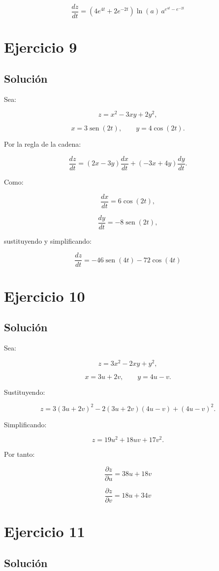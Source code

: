 \documentclass[11pt,a4paper]{article}
\newcommand{\sen}{\operatorname{sen}}
\begin{document}
\[
\boxed{
\frac{dz}{dt}
=
\left(
4e^{4t}
+
2e^{-2t}
\right)
\ln(a)\,
a^{e^{4t}-e^{-2t}}
}
\]

\section{Ejercicio 9}
\subsection{Solución}

Sea:

\[
z=x^2-3xy+2y^2,
\]

\[
x=3\sen(2t),
\qquad
y=4\cos(2t).
\]

Por la regla de la cadena:

\[
\frac{dz}{dt}
=
(2x-3y)\frac{dx}{dt}
+
(-3x+4y)\frac{dy}{dt}.
\]

Como:

\[
\frac{dx}{dt}=6\cos(2t),
\]

\[
\frac{dy}{dt}=-8\sen(2t),
\]

sustituyendo y simplificando:

\[
\boxed{
\frac{dz}{dt}
=
-46\sen(4t)-72\cos(4t)
}
\]

\section{Ejercicio 10}
\subsection{Solución}

Sea:

\[
z=3x^2-2xy+y^2,
\]

\[
x=3u+2v,
\qquad
y=4u-v.
\]

Sustituyendo:

\[
z
=
3(3u+2v)^2
-
2(3u+2v)(4u-v)
+
(4u-v)^2.
\]

Simplificando:

\[
z
=
19u^2+18uv+17v^2.
\]

Por tanto:

\[
\boxed{
\frac{\partial z}{\partial u}
=
38u+18v
}
\]

\[
\boxed{
\frac{\partial z}{\partial v}
=
18u+34v
}
\]

\section{Ejercicio 11}
\subsection{Solución}
\end{document}
